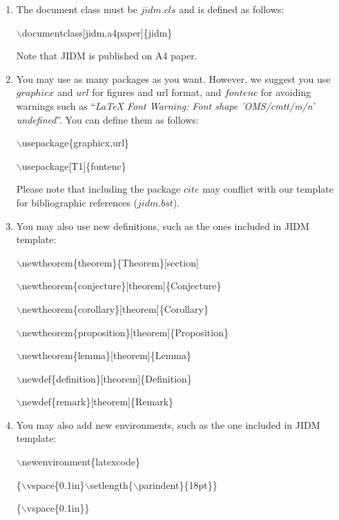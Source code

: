\documentclass[jidm,a4paper]{jidm} %
\newenvironment{latexcode}
{\ttfamily\vspace{0.1in}\setlength{\parindent}{18pt}}
{\vspace{0.1in}}
\begin{document}
\begin{enumerate}
	\item The document class must be $jidm.cls$ and is defined as follows:
	
				\begin{latexcode} 
		          $\backslash$documentclass[jidm,a4paper]\{jidm\}
		    \end{latexcode}
				
		\rmfamily Note that JIDM is published on A4 paper.

  \item You may use as many packages as you want. However, we suggest you use $graphicx$ and $url$ for figures and url format, and $fontenc$ for avoiding warnings such as ``\textit{LaTeX Font Warning: Font shape 'OMS/cmtt/m/n' undefined}''. You can define them as follows:
    
    	\begin{latexcode} 
				$\backslash$usepackage\{graphicx,url\} 
		
				$\backslash$usepackage[T1]\{fontenc\}\vspace{0.1in}
			\end{latexcode}
		
		Please note that including the package $cite$ may conflict with our template for bibliographic references ($jidm.bst$).
	
	\item You may also use new definitions, such as the ones included in JIDM template:
	
	
			\begin{latexcode} 
		  $\backslash$newtheorem\{theorem\}\{Theorem\}[section] 
		  
			$\backslash$newtheorem\{conjecture\}[theorem]\{Conjecture\}
			
			$\backslash$newtheorem\{corollary\}[theorem]\{Corollary\}
			
			$\backslash$newtheorem\{proposition\}[theorem]\{Proposition\}
			
			$\backslash$newtheorem\{lemma\}[theorem]\{Lemma\}
			
			$\backslash$newdef\{definition\}[theorem]\{Definition\}
			
			$\backslash$newdef\{remark\}[theorem]\{Remark\}
			\end{latexcode}
			
	\item You may also add new environments, such as the one included in JIDM template:

		\begin{latexcode} 
				$\backslash$newenvironment\{latexcode\} 
				
		    \{$\backslash$vspace\{0.1in\}$\backslash$setlength\{$\backslash$parindent\}\{18pt\}\} 
		    
				\{$\backslash$vspace\{0.1in\}\}
		\end{latexcode}
		 		
\end{enumerate}
\end{document}
